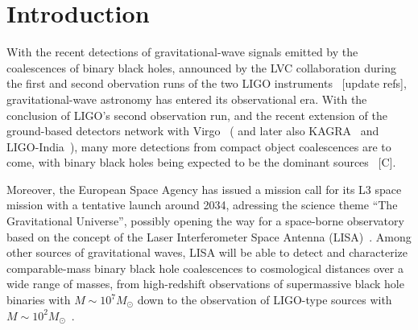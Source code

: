 \documentclass[aps,showpacs,twocolumn,
prd,superscriptaddress,nofootinbib]{revtex4-1}
\newcommand{\Msol}{M_{\odot}}
\newcommand{\SM}[1]{{\color{Red} #1}}
\newcommand{\jgb}[1]{{\color{DarkGreen} #1}}
\begin{document}
\maketitle


\section{Introduction}
\label{sec:intro}

With the recent detections of gravitational-wave signals emitted by the coalescences of binary black holes, announced by the LVC collaboration during the first and second obervation runs of the two LIGO instruments~\cite{LIGO-theevent-2016,LIGO-christmasevent-2016,LIGO-O1BBH-2016}\jgb{[update refs]}, gravitational-wave astronomy has entered its observational era. With the conclusion of LIGO's second observation run, and the recent extension of the ground-based detectors network with Virgo~\cite{Virgo} ( and later also KAGRA~\cite{KAGRA} and LIGO-India~\cite{INDIGO}), many more detections from compact object coalescences are to come, with binary black holes being expected to be the dominant sources~\cite{} \SM{[C]}.

Moreover, the European Space Agency has issued a mission call for its L3 space mission with a tentative launch around 2034, adressing the science theme ``The Gravitational Universe'', possibly opening the way for a space-borne observatory based on the concept of the Laser Interferometer Space Antenna (LISA)~\cite{LISA09,LISA17}. Among other sources of gravitational waves, LISA will be able to detect and characterize comparable-mass binary black hole coalescences to cosmological distances over a wide range of masses, from high-redshift observations of supermassive black hole binaries with $M\sim 10^{7} \Msol$ down to the observation of LIGO-type sources with $M\sim 10^{2} \Msol$~\cite{Sesana16}.
\end{document}
